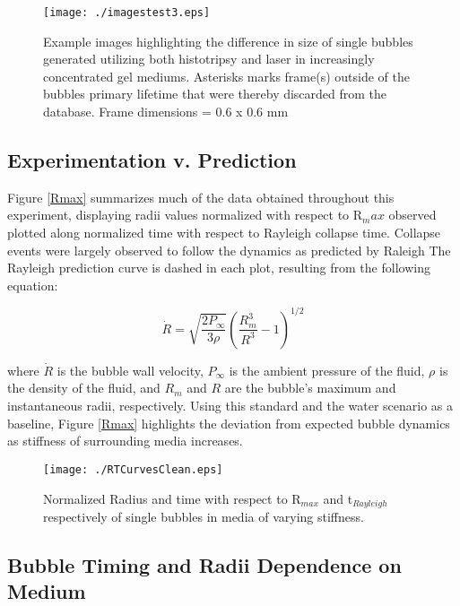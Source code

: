 \documentclass[prl,aps,epsf,twocolumn,superscriptaddress]{revtex4-1}
\begin{document}
\begin{figure*}[ht!] \centering
	\begin{center} 
		\texttt{[image: ./imagestest3.eps]} 
	\end{center}
	\caption{Example images highlighting the difference in size of single bubbles generated utilizing both histotripsy and laser in increasingly concentrated gel mediums. Asterisks marks frame(s) outside of the bubbles primary lifetime that were thereby discarded from the database. Frame dimensions = 0.6 x 0.6 mm}
	\label{fig:images}
\end{figure*}

\subsection{Experimentation v. Prediction} \label{sec:images}

Figure \ref{Rmax} summarizes much of the data obtained throughout this experiment, displaying radii values normalized with respect to R$_max$ observed plotted along normalized time with respect to Rayleigh collapse time. Collapse events were largely observed to follow the dynamics as predicted by Raleigh \cite{rayleigh1917} The Rayleigh prediction curve is dashed in each plot, resulting from the following equation: 

\begin{equation}\label{eq:rayPredict}
	\dot{R}=\sqrt{\frac{2P_{\infty}}{3\rho}}\left(\frac{R_m^3}{R^3}-1\right)^{1/2}
\end{equation} 

where $\dot{R}$ is the bubble wall velocity, $P_{\infty}$ is the ambient pressure of the fluid, $\rho$ is the density of the fluid, and $R_m$ and $R$ are the bubble's maximum and instantaneous radii, respectively. Using this standard and the water scenario as a baseline, Figure \ref{Rmax} highlights the deviation from expected bubble dynamics as stiffness of surrounding media increases. 

\begin{figure*}[ht!] \centering
	\begin{center} 
		\texttt{[image: ./RTCurvesClean.eps]} 
	\end{center}
	\caption{Normalized Radius and time with respect to R$_{max}$ and t$_{Rayleigh}$ respectively of single bubbles in media of varying stiffness.}
	\label{fig:Rmax}
\end{figure*}

\subsection{Bubble Timing and Radii Dependence on Medium} \label{sec:images}
\end{document}
